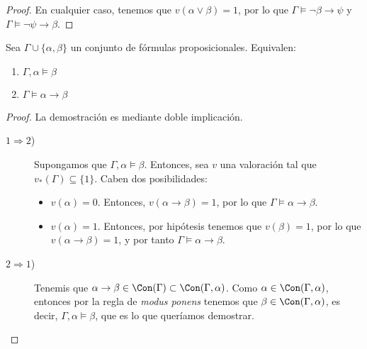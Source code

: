 \begin{ejercicio*}
\begin{proof}
        En cualquier caso, tenemos que $v(\alpha\lor \beta)=1$, por lo que $\Gamma \vDash \lnot \beta \rightarrow \psi$ y $\Gamma \vDash \lnot \psi \rightarrow \beta$.
    \end{proof}
\end{ejercicio*}


\begin{teo}[de la Reducción]
    Sea $\Gamma\cup \{\alpha,\beta\}$ un conjunto de fórmulas proposicionales. Equivalen:
    \begin{enumerate}
        \item $\Gamma,\alpha\vDash \beta$
        \item $\Gamma\vDash \alpha\rightarrow \beta$
    \end{enumerate}
    \begin{proof}
        La demostración es mediante doble implicación.
        \begin{description}
            \item[$1\Longrightarrow 2$)] Supongamos que $\Gamma,\alpha\vDash \beta$.
            Entonces, sea $v$ una valoración tal que $v_\ast(\Gamma)\subseteq \{1\}$.
            Caben dos posibilidades:
            \begin{itemize}
                \item $v(\alpha)=0$. Entonces, $v(\alpha\rightarrow \beta)=1$, por lo que $\Gamma\vDash \alpha\rightarrow \beta$.
                \item $v(\alpha)=1$. Entonces, por hipótesis tenemos que $v(\beta)=1$, por lo que $v(\alpha\rightarrow \beta)=1$, y por tanto $\Gamma\vDash \alpha\rightarrow \beta$.
            \end{itemize}

            \item[$2 \Longrightarrow 1$)] 
            Tenemis que $\alpha\to \beta\in \Con(\Gamma)\subset \Con(\Gamma,\alpha)$.
            Como $\alpha\in \Con(\Gamma,\alpha)$, entonces por la regla de \emph{modus ponens} tenemos que $\beta\in \Con(\Gamma,\alpha)$, es decir, $\Gamma,\alpha\vDash \beta$, que es lo que queríamos demostrar.
        \end{description}
    \end{proof}
\end{teo}

